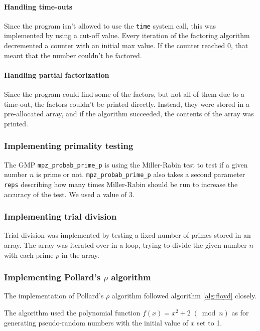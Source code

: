 \paragraph{Handling time-outs}
\label{sec:time-outs}

Since the program isn't allowed to use the \texttt{time} system call, 
this was implemented by using a cut-off value. Every iteration of the factoring
algorithm decremented a counter with an initial max value. If the counter
reached 0, that meant that the number couldn't be factored.

\paragraph{Handling partial factorization}
Since the program could find some of the factors, but not all of them due to a
time-out, the factors couldn't be printed directly. Instead, they were stored
in a pre-allocated array, and if the algorithm succeeded, the contents of the
array was printed.

\subsubsection{Implementing primality testing}
The GMP \texttt{mpz\_probab\_prime\_p} is using the Miller-Rabin test to test
if a given number $n$ is prime or not. \texttt{mpz\_probab\_prime\_p} also
takes a second parameter \texttt{reps} describing how many times Miller-Rabin
should be run to increase the accuracy of the test. We used a value of 3.

\subsubsection{Implementing trial division}
Trial division was implemented by testing a fixed number of primes stored 
in an array. The array was iterated over in a loop, trying to divide the given
number $n$ with each prime $p$ in the array.

\subsubsection{Implementing Pollard's $\rho$ algorithm}
The implementation of Pollard's $\rho$ algorithm followed algorithm
\ref{alg:floyd} closely. 

The algorithm used the polynomial function $f(x) = x^2 + 2 \; (\bmod n)$ as for
generating pseudo-random numbers with the initial value of $x$ set to 1.


